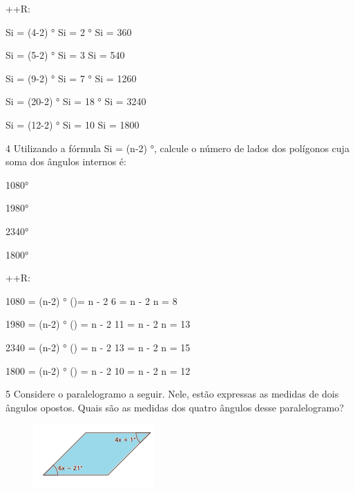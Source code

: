 ++R:
\item Si = (4-2) °
Si = 2 °
Si = 360

\item Si = (5-2) °
Si = 3 
Si = 540

\item Si = (9-2) °
Si = 7 °
Si = 1260

\item Si = (20-2) °
Si = 18 °
Si = 3240

\item Si = (12-2) °
Si = 10 
Si = 1800

\num{4} Utilizando a fórmula Si = (n-2) °, calcule o número de lados dos
polígonos cuja soma dos ângulos internos é:
\item 1080°
\item 1980°
\item 2340°
\item 1800°

++R:
\item 1080 = (n-2) °
()= n - 2
6 = n - 2
n = 8

\item 1980 = (n-2) °
() = n - 2
11 = n - 2
n = 13

\item 2340 = (n-2) °
() = n - 2
13 = n - 2
n = 15

\item 1800 = (n-2) °
() = n - 2
10 = n - 2
n = 12



\num{5} Considere o paralelogramo a seguir. Nele, estão expressas as medidas
de dois ângulos opostos. Quais são as medidas dos quatro ângulos desse
paralelogramo?

\begin{figure}[H]
\centering\includegraphics[width=1.82292in,height=0.95833in]{./imgSAEB_8_MAT/media/image9.png}
\end{figure}

\\
\\
\\

